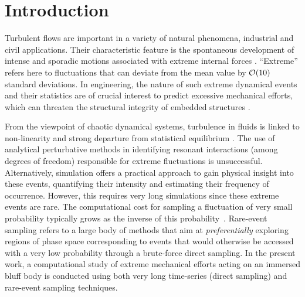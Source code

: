 \section{Introduction}

%
Turbulent flows are important in a variety of natural phenomena, industrial and civil applications.
Their characteristic feature is the spontaneous development of intense and sporadic motions associated with extreme internal forces \citep{lesieur_book,donzis_sreenivasan_2010,Yeung}.
``Extreme'' refers here to fluctuations that can deviate from the mean value by ${\cal{O}}(10)$ standard deviations.
In engineering, the nature of such extreme dynamical events and their statistics are of crucial interest to predict excessive mechanical efforts, which can threaten the structural integrity of embedded structures \citep{kanev2010}.
%

From the viewpoint of chaotic dynamical systems, turbulence in fluids is linked to non-linearity and strong departure from statistical equilibrium \citep{KRAICHNAN}.
The use of analytical perturbative methods in identifying resonant interactions (among degrees of freedom) responsible for extreme fluctuations is unsuccessful.
Alternatively, simulation offers a practical approach to gain physical insight into these events, quantifying their intensity and estimating their frequency of occurrence.
However, this requires very long simulations since these extreme events are rare. The computational cost for sampling a fluctuation of very small probability typically grows as the inverse of this probability~\citep{wouters2016rare}.
%
%
{Rare-event sampling refers to a large body of methods that aim at \emph{preferentially} exploring  regions of phase space corresponding to  events that would otherwise be accessed with a very low probability through a brute-force direct sampling.}
%
%	
%
In the present work, a computational study of extreme mechanical efforts acting on an immersed bluff body is conducted using both very long time-series (direct sampling) and rare-event sampling techniques.


